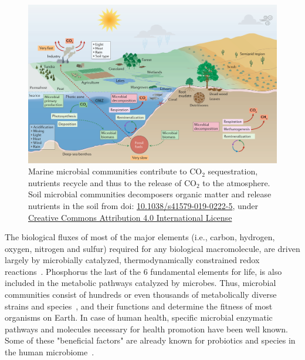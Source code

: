       \begin{figure}[h]
         \centering
         \includegraphics[width=135mm]{figures/ecosystem_functioning.png}
         \caption[The cycle of C and the role of microbial communiites]{Marine microbial communities contribute to CO$_2$ sequestration, nutrients recycle and thus to the release of CO$_2$ to the atmosphere. 
         Soil microbial communities decomposers organic matter and release nutrients in the soil 
         from \citep{cavicchioli2019scientists} doi: \href{https://doi.org/10.1038/s41579-019-0222-5}{10.1038/s41579-019-0222-5}, under \href{http://creativecommons.org/licenses/by/4.0 license}{Creative Commons Attribution 4.0 International License}
         }
         \label{fig:co2}
      \end{figure}

      The biological fluxes of most of the major elements (i.e., carbon, hydrogen, oxygen, nitrogen and sulfur) required
      for any biological macromolecule,
      are driven largely
      by microbially catalyzed, thermodynamically constrained redox reactions~\cite{falkowski2008microbial}. 
      Phosphorus the last of the 6 fundamental elements for life, is also included in the metabolic pathways catalyzed by microbes. 
      Thus, microbial communities consist of hundreds or even thousands of metabolically diverse strains and species~\cite{leventhal2018strain},
      and their functions
      and determine the fitness of most organisms on Earth. 
      In case of human health, specific microbial enzymatic pathways and molecules necessary for health promotion have been well known.
      Some of these "beneficial factors" are already known for probiotics and species in the human microbiome~\cite{marco2021defining}.


